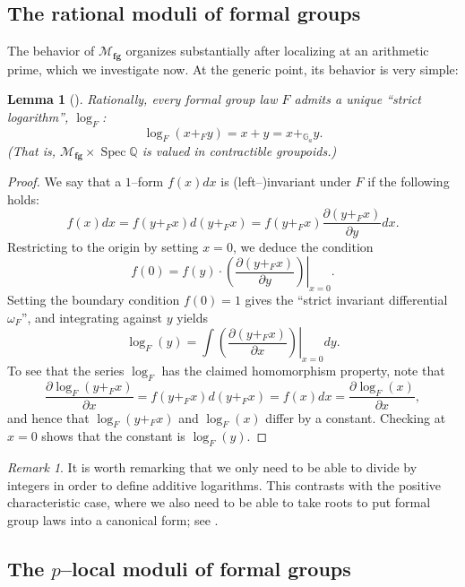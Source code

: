 \documentclass{amsart}
\newcommand{\G}{\mathbb G}
\newcommand{\Q}{\mathbb{Q}}
\newcommand{\<}{\langle}
\renewcommand{\>}{\rangle}
\newcommand{\moduli}[1]{\mathcal{M}_{\mathbf{#1}}}
\DeclareMathOperator{\Spec}{Spec}
\theoremstyle{plain}
\newtheorem*{lemma}{Lemma}
\theoremstyle{definition}
\theoremstyle{remark}
\newtheorem*{remark}{Remark}
\begin{document}
\subsection{The rational moduli of formal groups}

The behavior of $\moduli{fg}$ organizes substantially after localizing at an arithmetic prime, which we investigate now.  At the generic point, its behavior is very simple:

\begin{lemma}[{\cite[Proposition 4]{Lazard}}]\label{RationalFGLsHaveLogs}
Rationally, every formal group law $F$ admits a unique ``strict logarithm'', $\log_F$: \[\log_F(x +_F y) = x + y = x +_{\G_a} y.\]  (That is, $\moduli{fg} \times \Spec \Q$ is valued in contractible groupoids.)
\end{lemma}
\begin{proof}
We say that a $1$--form $f(x) dx$ is (left--)invariant under $F$ if the following holds: \[f(x) dx = f(y +_F x) d(y +_F x) = f(y +_F x) \frac{\partial(y +_F x)}{\partial y} dx.\]  Restricting to the origin by setting $x = 0$, we deduce the condition \[f(0) = f(y) \cdot \left.\left( \frac{\partial( y +_F x)}{\partial y} \right) \right|_{x=0}.\]  Setting the boundary condition $f(0) = 1$ gives the ``strict invariant differential $\omega_F$'', and integrating against $y$ yields \[\log_F(y) = \int \left. \left( \frac{\partial(y +_F x)}{\partial x} \right)\right|_{x=0} dy.\]  To see that the series $\log_F$ has the claimed homomorphism property, note that \[\frac{\partial \log_F(y +_F x)}{\partial x} = f(y +_F x) d(y +_F x) = f(x) dx = \frac{\partial \log_F(x)}{\partial x},\] and hence that $\log_F(y +_F x)$ and $\log_F(x)$ differ by a constant.  Checking at $x = 0$ shows that the constant is $\log_F(y)$.
\end{proof}

\begin{remark}
It is worth remarking that we only need to be able to divide by integers in order to define additive logarithms.  This contrasts with the positive characteristic case, where we also need to be able to take roots to put formal group laws into a canonical form; see .
\end{remark}

\subsection{The $p$--local moduli of formal groups}
\end{document}
